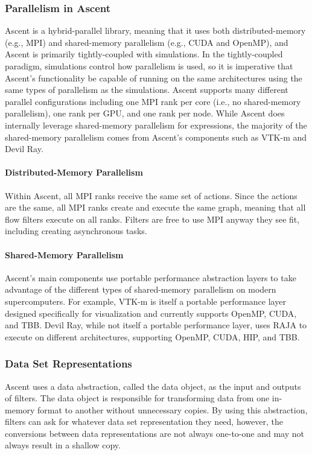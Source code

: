 \subsubsection{Parallelism in Ascent}
Ascent is a hybrid-parallel library, meaning that it uses both
distributed-memory (e.g., MPI) and shared-memory parallelism
(e.g., CUDA and OpenMP), and Ascent is primarily
tightly-coupled with simulations.
%
In the tightly-coupled paradigm, simulations control how parallelism is used, so
it is imperative that Ascent's functionality be capable of running
on the same architectures using the same types of parallelism as the
simulations.
%
Ascent supports many different parallel configurations including
one MPI rank per core (i.e., no shared-memory parallelism), one rank
per GPU, and one rank per node.
%
While Ascent does internally leverage shared-memory parallelism
for expressions, the majority of the shared-memory parallelism comes
from Ascent's components such as VTK-m and Devil Ray.

\paragraph{Distributed-Memory Parallelism}
Within Ascent, all MPI ranks receive the same set of actions.
%
Since the actions are the same, all MPI ranks create and execute the same graph,
meaning
that all flow filters execute on all ranks.
%
Filters are free to use MPI anyway they see fit, including
creating asynchronous tasks.

\paragraph{Shared-Memory Parallelism}
Ascent's main components use portable performance abstraction layers to
take advantage of the different types of shared-memory parallelism on
modern supercomputers.
%
For example, VTK-m is itself a portable performance layer designed specifically
for visualization and currently supports OpenMP, CUDA, and TBB.
%
Devil Ray, while not itself a portable performance layer, uses RAJA to execute
on different architectures, supporting OpenMP, CUDA, HIP, and TBB.

\subsubsection{Data Set Representations}
Ascent uses a data abstraction, called the data object, as the input
and outputs of filters.
%
The data object is responsible for transforming data from one in-memory format
to another without unnecessary copies.
%
By using this abstraction, filters can ask for whatever data set
representation they need, however, the conversions between data
representations are not always one-to-one and may not always
result in a shallow copy.
%

